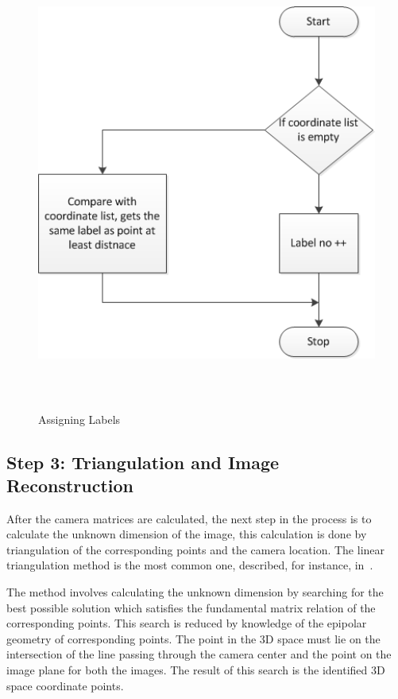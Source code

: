  \begin{figure}[ht]
    \centering
    \includegraphics[width=15cm,height=15cm,keepaspectratio]{Pictures/AL}
    \caption{Assigning Labels}
    \label{fig:Triangulate}
	\end{figure}
\pagebreak



\subsection{Step 3: Triangulation and  Image Reconstruction}
After the camera matrices are calculated, the next step in the process is to calculate the unknown dimension of the image, this calculation is done by triangulation of the corresponding points and the camera location. The linear triangulation method is the most common one, described, for instance, in~\cite{hartley2003multiple}. 

The method involves calculating the unknown dimension by searching for the best possible solution which satisfies the fundamental matrix relation of the corresponding points. This search is reduced by knowledge of the epipolar geometry of corresponding points. The point in the 3D space must lie on the intersection of the line passing through the camera center and the point on the image plane for both the images. The result of this search is the identified 3D space coordinate points.

